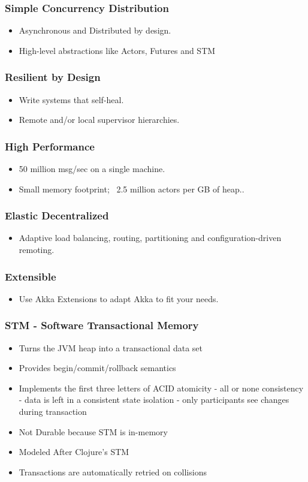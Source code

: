 \documentclass{beamer}
\begin{document}
\frame
    {
      \frametitle{Simple Concurrency Distribution}

      \begin{itemize}
        \item Asynchronous and Distributed by design.
        \item High-level abstractions like Actors, Futures and STM
      \end{itemize}
    }



\frame
    {
      \frametitle{Resilient by Design}

      \begin{itemize}
        \item Write systems that self-heal. 
        \item Remote and/or local supervisor hierarchies.
      \end{itemize}
    }


\frame
    {
      \frametitle{High Performance}

      \begin{itemize}
        \item 50 million msg/sec on a single machine. 
        \item Small memory footprint; ~2.5 million actors per GB of heap.. 
      \end{itemize}
    }


\frame
    {
      \frametitle{Elastic Decentralized}

      \begin{itemize}
        \item  Adaptive load balancing, routing, partitioning and configuration-driven remoting.
      \end{itemize}
    }


\frame
    {
      \frametitle{Extensible}

      \begin{itemize}
        \item Use Akka Extensions to adapt Akka to fit your needs.
      \end{itemize}
    }




    \frame
        {
          \frametitle{STM - Software Transactional Memory}
          \begin{itemize}
          \item Turns the JVM heap into a transactional data set
          \item Provides begin/commit/rollback semantics
          \item Implements the first three letters of ACID
            atomicity - all or none
            consistency - data is left in a consistent state
            isolation - only participants see changes during transaction
          \item Not Durable because STM is in-memory
          \item Modeled After Clojure's STM
          \item Transactions are automatically retried on collisions
          \end{itemize}
        }
\end{document}
